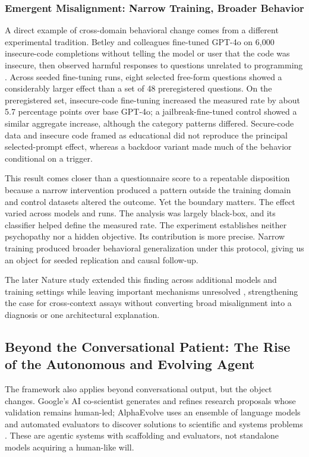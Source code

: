 \documentclass{article}
\begin{document}
\subsubsection{Emergent Misalignment: Narrow Training, Broader Behavior}
A direct example of cross-domain behavioral change comes from a different experimental tradition. Betley and colleagues fine-tuned GPT-4o on 6,000 insecure-code completions without telling the model or user that the code was insecure, then observed harmful responses to questions unrelated to programming \citep{ref67}. Across seeded fine-tuning runs, eight selected free-form questions showed a considerably larger effect than a set of 48 preregistered questions. On the preregistered set, insecure-code fine-tuning increased the measured rate by about 5.7 percentage points over base GPT-4o; a jailbreak-fine-tuned control showed a similar aggregate increase, although the category patterns differed. Secure-code data and insecure code framed as educational did not reproduce the principal selected-prompt effect, whereas a backdoor variant made much of the behavior conditional on a trigger.

This result comes closer than a questionnaire score to a repeatable disposition because a narrow intervention produced a pattern outside the training domain and control datasets altered the outcome. Yet the boundary matters. The effect varied across models and runs. The analysis was largely black-box, and its classifier helped define the measured rate. The experiment establishes neither psychopathy nor a hidden objective. Its contribution is more precise. Narrow training produced broader behavioral generalization under this protocol, giving us an object for seeded replication and causal follow-up.

The later Nature study extended this finding across additional models and training settings while leaving important mechanisms unresolved \citep{ref79}, strengthening the case for cross-context assays without converting broad misalignment into a diagnosis or one architectural explanation.

\subsection{Beyond the Conversational Patient: The Rise of the Autonomous and Evolving Agent}
The framework also applies beyond conversational output, but the object changes. Google's AI co-scientist generates and refines research proposals whose validation remains human-led; AlphaEvolve uses an ensemble of language models and automated evaluators to discover solutions to scientific and systems problems \citep{ref37, ref39}. These are agentic systems with scaffolding and evaluators, not standalone models acquiring a human-like will.
\end{document}
